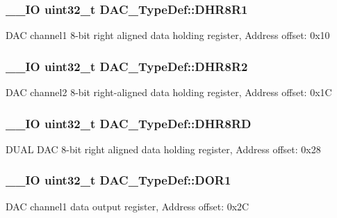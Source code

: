 \subsubsection[{D\+H\+R8\+R1}]{\setlength{\rightskip}{0pt plus 5cm}\+\_\+\+\_\+\+I\+O uint32\+\_\+t D\+A\+C\+\_\+\+Type\+Def\+::\+D\+H\+R8\+R1}\label{struct_d_a_c___type_def_a3a382d341fb608a04390bacb8c00b0f0}
D\+A\+C channel1 8-\/bit right aligned data holding register, Address offset\+: 0x10 \hypertarget{struct_d_a_c___type_def_a3b096b71656f8fb32cd18b4c8b1d2334}{}
\subsubsection[{D\+H\+R8\+R2}]{\setlength{\rightskip}{0pt plus 5cm}\+\_\+\+\_\+\+I\+O uint32\+\_\+t D\+A\+C\+\_\+\+Type\+Def\+::\+D\+H\+R8\+R2}\label{struct_d_a_c___type_def_a3b096b71656f8fb32cd18b4c8b1d2334}
D\+A\+C channel2 8-\/bit right-\/aligned data holding register, Address offset\+: 0x1\+C \hypertarget{struct_d_a_c___type_def_a03f8d95bbf0ce3a53cb79506d5bf995a}{}
\subsubsection[{D\+H\+R8\+R\+D}]{\setlength{\rightskip}{0pt plus 5cm}\+\_\+\+\_\+\+I\+O uint32\+\_\+t D\+A\+C\+\_\+\+Type\+Def\+::\+D\+H\+R8\+R\+D}\label{struct_d_a_c___type_def_a03f8d95bbf0ce3a53cb79506d5bf995a}
D\+U\+A\+L D\+A\+C 8-\/bit right aligned data holding register, Address offset\+: 0x28 \hypertarget{struct_d_a_c___type_def_a50b4f0b0d2a376f729c8d7acf47864c3}{}
\subsubsection[{D\+O\+R1}]{\setlength{\rightskip}{0pt plus 5cm}\+\_\+\+\_\+\+I\+O uint32\+\_\+t D\+A\+C\+\_\+\+Type\+Def\+::\+D\+O\+R1}\label{struct_d_a_c___type_def_a50b4f0b0d2a376f729c8d7acf47864c3}
D\+A\+C channel1 data output register, Address offset\+: 0x2\+C \hypertarget{struct_d_a_c___type_def_a1bde8391647d6422b39ab5ba4f13848b}{}
